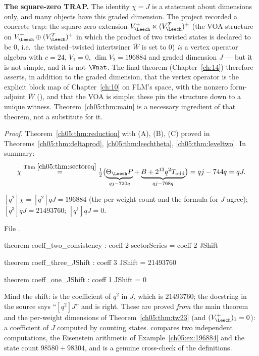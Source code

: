 \begin{warning}
\textbf{The square-zero TRAP.}
The identity $\chi = J$ is a statement about dimensions only, and many objects have this graded
dimension. The project recorded a concrete trap: the square-zero extension $V_\Leech^+\ltimes(V_\Leech^T)^+$
(the VOA structure on $V_\Leech^+\oplus(V_\Leech^T)^+$ in which the product of two twisted states is declared to
be $0$, i.e.\ the twisted--twisted intertwiner $\overline W$ is set to $0$) \emph{is} a vertex operator
algebra with $c = 24$, $V_1 = 0$, $\dim V_2 = 196884$ and graded dimension $J$ --- but it is not simple,
and it is not $\Vnat$. The final theorem  (Chapter~\ref{ch:14}) therefore
asserts, in addition to the graded dimension, that the vertex operator is the explicit block map of
Chapter~\ref{ch:10} on FLM's space, with the nonzero form-adjoint $\overline W$ (),
and that the VOA is simple; these pin the structure down to a unique witness. Theorem~\ref{ch05:thm:main} is a necessary ingredient of
that theorem, not a substitute for it.
\end{warning}

\noindent\emph{Proof.} Theorem~\ref{ch05:thm:reduction} with (A), (B), (C) proved in
Theorems~\ref{ch05:thm:deltaprod}, \ref{ch05:thm:leechtheta}, \ref{ch05:thm:leveltwo}. In summary:
\begin{equation*}
  \chi \overset{\text{Thm }\ref{ch05:thm:sectoreq}}{=} \tfrac12\bigl(\underbrace{\Theta_\Leech P}_{qj-720q}
  + \underbrace{B + 2^{13}q^2T_{\mathrm{odd}}}_{qj-768q}\bigr) = qj - 744q = qJ.
\end{equation*}

\begin{corollary}\label{ch05:cor:coeffs}
$[q^2]\chi = [q^2]qJ = 196884$ (the per-weight count and the formula for $J$ agree);
$[q^3]qJ = 21493760$; $[q^1]qJ = 0$.
\end{corollary}
\noindent File .
\begin{leancode}
theorem coeff_two_consistency : coeff 2 sectorSeries = coeff 2 JShift

theorem coeff_three_JShift : coeff 3 JShift = 21493760

theorem coeff_one_JShift : coeff 1 JShift = 0
\end{leancode}
\begin{dictionary}
Mind the shift:  is the coefficient of $q^2$ in $J$, which is $21493760$; the
docstring in the source says ``$[q^2]J$'' and is right. These are proved \emph{from} the main theorem
and the per-weight dimensions of Theorem~\ref{ch05:thm:tw23} (and $(V_\Leech^+)_1 = 0$): a coefficient of
$J$ computed by counting states.  compares two independent computations,
the Eisenstein arithmetic of Example~\ref{ch05:ex:196884} and the state count $98580+98304$, and is a
genuine cross-check of the definitions.
\end{dictionary}

